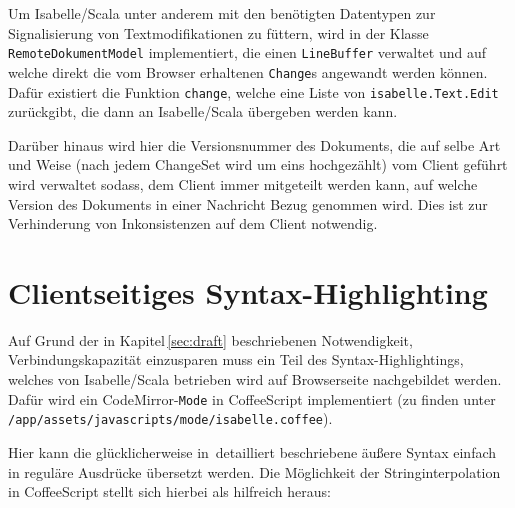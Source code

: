 Um Isabelle/Scala unter anderem mit den benötigten Datentypen zur Signalisierung von
Textmodifikationen zu füttern, wird in der Klasse \texttt{RemoteDokumentModel} implementiert, die
einen \texttt{LineBuffer} verwaltet und auf welche direkt die vom Browser erhaltenen
\texttt{Change}s angewandt werden können. Dafür existiert die Funktion \texttt{change}, welche eine
Liste von \texttt{isabelle.Text.Edit} zurückgibt, die dann an Isabelle/Scala übergeben werden kann.

Darüber hinaus wird hier die Versionsnummer des Dokuments, die auf selbe Art und Weise (nach jedem
ChangeSet wird um eins hochgezählt) vom Client geführt wird verwaltet sodass, dem Client immer
mitgeteilt werden kann, auf welche Version des Dokuments in einer Nachricht Bezug genommen wird.
Dies ist zur Verhinderung von Inkonsistenzen auf dem Client notwendig.

\section{Clientseitiges Syntax-Highlighting}
\label{sec:syntax}

Auf Grund der in Kapitel\,\ref{sec:draft} beschriebenen Notwendigkeit, Verbindungskapazität
einzusparen muss ein Teil des Syntax-Highlightings, welches von Isabelle/Scala betrieben wird auf
Browserseite nachgebildet werden. Dafür wird ein CodeMirror-\texttt{Mode} in CoffeeScript
implementiert (zu finden unter \texttt{/app/assets/javascripts/mode/isabelle.coffee}).

Hier kann die glücklicherweise in\,\cite{isabelle} detailliert beschriebene äußere Syntax einfach in
reguläre Ausdrücke übersetzt werden. Die Möglichkeit der Stringinterpolation in CoffeeScript stellt
sich hierbei als hilfreich heraus:

